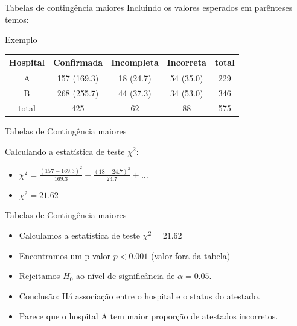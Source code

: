 \documentclass{beamer}
\begin{document}
\begin{frame}{Tabelas de contingência maiores}
  Incluindo os valores esperados em parênteses temos:
  \begin{exampleblock}{Exemplo}
    \begin{tabular}{c|c|c|c|c}
      Hospital & Confirmada & Incompleta &
      Incorreta & total\\
      \hline
      A & 157 (169.3) & 18 (24.7) & 54 (35.0) & 229\\
      \hline
      B & 268 (255.7) & 44 (37.3) & 34 (53.0) & 346\\
      \hline
      total & 425 & 62 & 88 & 575\\
    \end{tabular}
  \end{exampleblock}
\end{frame}

\begin{frame}{Tabelas de Contingência maiores}

  Calculando a estatística de teste $\chi^2$:

  \begin{itemize}
  \item $\chi^2 = \frac{(157 - 169.3)^2}{169.3} +
  \frac{(18-24.7)^2}{24.7}  + \ldots$
\item $\chi^2 = 21.62$
\end{itemize}
\end{frame}

\begin{frame}{Tabelas de Contingência maiores}
  \begin{itemize}
  \item Calculamos a estatística de teste $\chi^2 = 21.62$
  \item Encontramos um p-valor $p<0.001$ (valor fora da tabela)
  \item Rejeitamos $H_0$ ao nível de significância de $\alpha = 0.05$.
  \item Conclusão: Há associação entre o hospital e o status do atestado.
  \item Parece que o hospital A tem maior proporção de atestados incorretos.
  \end{itemize}
\end{frame}

\end{document}
